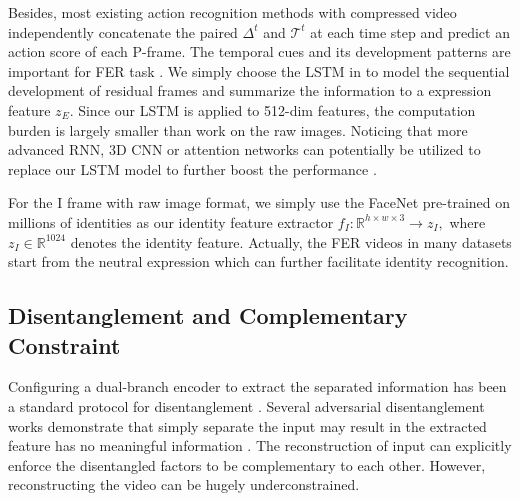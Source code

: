 \documentclass[a4paper,conference]{IEEEtran}
\begin{document}
Besides, most existing action recognition methods with compressed video \cite{wu2018compressed,shou2019dmc} independently concatenate the paired $\Delta ^t$ and $\mathcal{T}^t$ at each time step and predict an action score of each P-frame. The temporal cues and its development patterns are important for FER task \cite{li2020deep}. We simply choose the LSTM in \cite{baddar2019mode} to model the sequential development of residual frames and summarize the information to a expression feature $z_E$. Since our LSTM is applied to 512-dim features, the computation burden is largely smaller than work on the raw images. Noticing that more advanced RNN, 3D CNN or attention networks can potentially be utilized to replace our LSTM model to further boost the performance \cite{barros2016developing,zhao2018learning,kumawat2019lbvcnn}.


 





For the I frame with raw image format, we simply use the FaceNet \cite{schroff2015facenet} pre-trained on millions of identities \cite{kemelmacher2016megaface} as our identity feature extractor $f_{I}:\mathbb{R}^{h\times w\times 3}\rightarrow z_{I},$ where $z_{I}\in\mathbb{R}^{1024}$ denotes the identity feature. Actually, the FER videos in many datasets start from the neutral expression which can further facilitate identity recognition. 







\subsection{Disentanglement and Complementary Constraint}
Configuring a dual-branch encoder to extract the separated information has been a standard protocol for disentanglement \cite{liu2019feature}. Several adversarial disentanglement works demonstrate that simply separate the input may result in the extracted feature has no meaningful information \cite{mathieu2016disentangling,liu2019feature}. The reconstruction of input can explicitly enforce the disentangled factors to be complementary to each other. However, reconstructing the video can be hugely underconstrained.  
\end{document}
